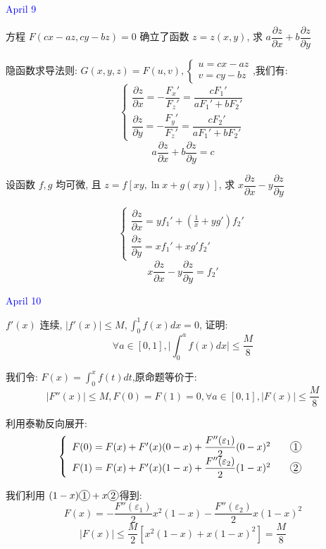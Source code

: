 \textcolor{blue}{April 9}

\begin{example}[][Exam: 30.2.3]
	方程 $F(cx-az,cy-bz)=0$ 确立了函数 $z=z(x,y)$, 求 $a\dfrac{\partial z}{\partial x}+b\dfrac{\partial z}{\partial y}$
\end{example}

\begin{solution}
	
	隐函数求导法则: 
	$G(x,y,z)=F(u,v),\left\lbrace\begin{array}{l}
		u=cx-az\\v=cy-bz
	\end{array} \right. $,我们有: 
	$$\left\lbrace\begin{array}{l}
		\dfrac{\partial z}{\partial x}=-\dfrac{F_{x}'}{F_{z}'}=\dfrac{cF_{1}'}{aF_{1}'+bF_{2}'}\\
		\dfrac{\partial z}{\partial y}=-\dfrac{F_{y}'}{F_{z}'}=\dfrac{cF_{2}'}{aF_{1}'+bF_{2}'}
	\end{array} \right. $$
	$$a\dfrac{\partial z}{\partial x}+b\dfrac{\partial z}{\partial y}=c$$
\end{solution}

\begin{example}[][Exam: 30.2.4]
	设函数 $f,g$ 均可微, 且 $z=f\left[xy,\ln x+g(xy)\right]$, 求 $x\dfrac{\partial z}{\partial x}-y\dfrac{\partial z}{\partial y}$
\end{example}

\begin{solution}
	$$\left\lbrace 
	\begin{array}{l}
		\dfrac{\partial z}{\partial x}=yf_{1}'+(\frac{1}{x}+yg')f_{2}'\\
		\dfrac{\partial z}{\partial y}=xf_{1}'+xg'f_{2}'
	\end{array}\right. $$
	$$x\frac{\partial z}{\partial x}-y\frac{\partial z}{\partial y}=f_{2}'$$
\end{solution}


\textcolor{blue}{April 10}

\begin{example}[][Exam: 30.2.5]
	$f'(x)$ 连续, $|f'(x)|\leq M,\int_{0}^{1}f(x)dx=0$, 证明: 
	$$\forall a\in [0,1], \big|\int_{0}^{a}f(x)dx\big| \leq \dfrac{M}{8}$$
\end{example}

\begin{solution}
	
	我们令: $F(x)=\int_{0}^{x}f(t)dt$,原命题等价于: 
	$$|F''(x)|\leq M, F(0)=F(1)=0, \forall a\in [0,1],|F(x)|\leq \frac{M}{8}$$
	
	利用泰勒反向展开: 
	$$\left\lbrace 
	\begin{array}{l}
		F(0)=F(x)+F'(x)(0-x)+\dfrac{F''(\varepsilon_{1})}{2}(0-x)^2 \qquad \circled{1} \\
		F(1)=F(x)+F'(x)(1-x)+\dfrac{F''(\varepsilon_{2})}{2}(1-x)^2 \qquad \circled{2}
	\end{array}\right. $$
	
	我们利用 $(1-x) \circled{1}+x \circled{2}$得到: 
	$$F(x)=-\frac{F''(\varepsilon_{1})}{2}x^2(1-x)-\frac{F''(\varepsilon_{2})}{2}x(1-x)^2$$
	$$|F(x)|\leq \frac{M}{2}[x^2(1-x)+x(1-x)^2]=\frac{M}{8}$$
\end{solution}

